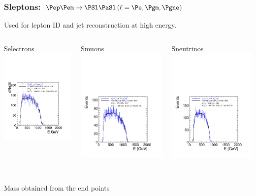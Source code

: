 \documentclass{beamer}
\begin{document}
\begin{frame}
\frametitle{Sleptons: $\Pep\Pem \to \PSl \PaSl \,(\ell = \Pe,\Pgm,\Pgne)$}
Used for \alert{lepton ID} and \alert{jet reconstruction at high energy}. 
\begin{columns}[c]
\column{3.8cm}
\begin{center}
Selectrons\\
\includegraphics[width=3.8cm]{202_H1LPADC4.pdf}
\end{center}
\column{4.6cm}
\begin{center}
Smuons\\
\includegraphics[width=4.6cm]{205_H1LPADC4.pdf}
\end{center}
\column{4.6cm}
\begin{center}
Sneutrinos\\
\includegraphics[width=4.6cm]{213_H1LPADC4.pdf}
\end{center}
\end{columns}
~\\
Mass obtained from the end points
\end{frame}
\end{document}
